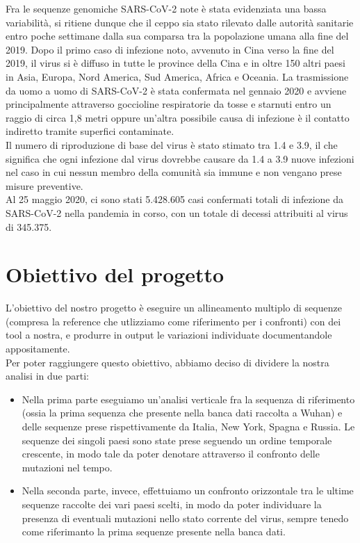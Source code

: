 \documentclass[a4paper,10pt]{article}
\begin{document}
Fra le sequenze genomiche SARS-CoV-2 note è stata evidenziata una bassa variabilità, si ritiene dunque che il ceppo sia stato rilevato dalle autorità sanitarie entro poche settimane dalla sua comparsa tra la popolazione umana alla fine del 2019.
Dopo il primo caso di infezione noto, avvenuto in Cina verso la fine del 2019, il virus si è diffuso in tutte le province della Cina e in oltre 150 altri paesi in Asia, Europa, Nord America, Sud America, Africa e Oceania.
La trasmissione da uomo a uomo di SARS-CoV-2 è stata confermata nel gennaio 2020 e avviene principalmente attraverso goccioline respiratorie da tosse e starnuti entro un raggio di circa 1,8 metri oppure un'altra possibile causa di infezione è il contatto indiretto tramite superfici contaminate.\\
Il numero di riproduzione di base del virus è stato stimato tra 1.4 e 3.9, il che significa che ogni infezione dal virus dovrebbe causare da 1.4 a 3.9 nuove infezioni nel caso in cui nessun membro della comunità sia immune e non vengano prese misure preventive.\\
Al 25 maggio 2020, ci sono stati 5.428.605 casi confermati totali di infezione da SARS-CoV-2 nella pandemia in corso, con un totale di decessi attribuiti al virus di 345.375. 

\newpage

\section{Obiettivo del progetto}
L'obiettivo del nostro progetto è eseguire un allineamento multiplo di sequenze (compresa la reference che utlizziamo come riferimento per i confronti) con dei tool a nostra, e produrre in output le variazioni individuate documentandole appositamente. \\
Per poter raggiungere questo obiettivo, abbiamo deciso di dividere la nostra analisi in due parti:\\ 
\begin{itemize}
\item Nella prima parte eseguiamo un'analisi verticale fra la sequenza di riferimento (ossia la prima sequenza che presente nella banca dati raccolta a Wuhan) e delle sequenze prese rispettivamente da Italia, New York, Spagna e Russia. Le sequenze dei singoli paesi sono state prese seguendo un ordine temporale crescente, in modo tale da poter denotare attraverso il confronto delle mutazioni nel tempo.
\item Nella seconda parte, invece, effettuiamo un confronto orizzontale tra le ultime sequenze raccolte dei vari paesi scelti, in modo da poter individuare la presenza di eventuali mutazioni nello stato corrente del virus, sempre tenedo come riferimanto la prima sequenze presente nella banca dati. 
\end{itemize}
\end{document}
